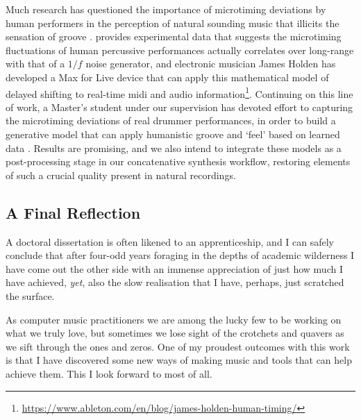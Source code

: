 Much research has questioned the importance of microtiming deviations by human performers in the perception of natural sounding music that illicits the sensation of groove \citep{progler1995searching, davies2013effect, fruhauf2013music}. \cite{Hennig2014} provides experimental data that suggests the microtiming fluctuations of human percussive performances actually correlates over long-range with that of a $1/f$ noise generator, and electronic musician James Holden has developed a Max for Live device that can apply this mathematical model of delayed shifting to real-time \acrshort{midi} and audio information\footnote{\url{https://www.ableton.com/en/blog/james-holden-human-timing/}}. Continuing on this line of work, a Master's student under our supervision has devoted effort to capturing the microtiming deviations of real drummer performances, in order to build a generative model that can apply humanistic groove and `feel' based on learned data \citep{Troes2017}. Results are promising, and we also intend to integrate these models as a post-processing stage in our concatenative synthesis workflow, restoring elements of such a crucial quality present in natural recordings. 

\subsection{A Final Reflection} 

A doctoral dissertation is often likened to an apprenticeship, and I can safely conclude that after four-odd years foraging in the depths of academic wilderness I have come out the other side with an immense  appreciation of just how much I have achieved, \textit{yet}, also the slow realisation that I have, perhaps, just scratched the surface.

As computer music practitioners we are among the lucky few to be working on what we truly love, but sometimes we lose sight of the crotchets and quavers as we sift through the ones and zeros. One of my proudest outcomes with this work is that I have discovered some new ways of making music and tools that can help achieve them. This I look forward to most of all.






